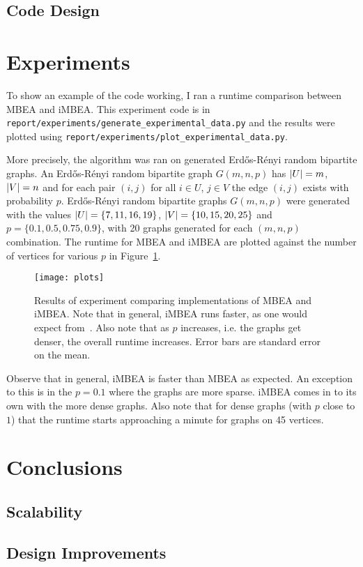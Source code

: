\subsection{Code Design}
\section{Experiments}
To show an example of the code working, I ran a runtime comparison between MBEA and iMBEA.
This experiment code is in \texttt{report/experiments/generate\_experimental\_data.py} and the results were plotted using \texttt{report/experiments/plot\_experimental\_data.py}.
\par
More precisely, the algorithm was ran on generated Erd\H{o}s-R\'{e}nyi random bipartite graphs.
An Erd\H{o}s-R\'enyi random bipartite graph $G(m,n,p)$ has $\abs{U} = m$, $\abs{V} =n$ and for each pair $(i,j)$ for all $i\in U$, $j\in V$ the edge $(i,j)$ exists with probability $p$.
Erd\H{o}s-R\'enyi random bipartite graphs $G(m,n,p)$ were generated with the values $\abs{U} = \{7, 11, 16, 19\}$, $\abs{V} = \{10, 15, 20, 25\}$ and $p=\{0.1, 0.5, 0.75, 0.9\}$, with 20 graphs generated for each $(m,n,p)$ combination.
The runtime for MBEA and iMBEA are plotted against the number of vertices for various $p$ in Figure~\ref{fig:plots}. 
\begin{figure}
    \centering
    \texttt{[image: plots]}
    \caption{
    Results of experiment comparing implementations of MBEA and iMBEA.
    Note that in general, iMBEA runs faster, as one would expect from~\cite{Zhang2014}.
    Also note that as $p$ increases, i.e. the graphs get denser, the overall runtime increases.
    Error bars are standard error on the mean.
    }
    \label{fig:plots}
\end{figure}
\par
Observe that in general, iMBEA is faster than MBEA as expected.
An exception to this is in the $p=0.1$ where the graphs are more sparse.
iMBEA comes in to its own with the more dense graphs.
Also note that for dense graphs (with $p$ close to $1$) that the runtime starts approaching a minute for graphs on 45 vertices.

\section{Conclusions}
\subsection{Scalability}
\subsection{Design Improvements}

